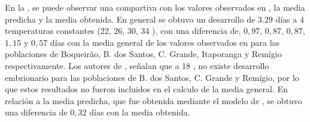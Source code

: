 En la , se puede observar una compartiva con los
valores observados en \cite{BESERRA2006}, la media predicha y la media obtenida. En general se
obtuvo un desarrollo de $3.29$ días a 4 temperaturas constantes (22, 26, 30, 34 \textcelsius), con
una diferencia de, $0,97$, $0,87$, $0,87$, $1,15$ y $0,57$ días con la media general de los
valores observados en \cite{BESERRA2006} para las poblaciones de Boqueirão, B. dos Santos, C.
Grande, Itaporanga y Remígio respectivamente. Los autores de \cite{BESERRA2006}, señalan que a
18 \textcelsius, no existe desarrollo embrionario para las poblaciones de B. dos Santos, C. Grande
y Remígio, por lo que estos resultados no fueron incluidos en el calculo de la media general. En
relación a la media predicha, que fue obtenida mediante el modelo de \cite{sharpe1977reaction}, se
obtuvo una diferencia de $0,32$ días con la media obtenida.

